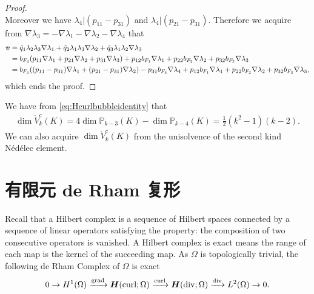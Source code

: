 \begin{proof}
\[\]
Moreover we have $\lambda_4|(p_{11}-p_{31})$ and $\lambda_4|(p_{21}-p_{31})$.
Therefore we acquire from $\nabla\lambda_{3}=-\nabla\lambda_{1}-\nabla\lambda_{2}-\nabla\lambda_{4}$ that
\begin{align*}
\boldsymbol v&=\tilde q_1\lambda_2\lambda_3\nabla\lambda_{1}+\tilde q_2\lambda_1\lambda_3\nabla\lambda_{2}+\tilde q_3\lambda_1\lambda_2\nabla\lambda_{3} \\
&=b_{F_4}(p_{11}\nabla\lambda_{1}+p_{21}\nabla\lambda_{2}+p_{31}\nabla\lambda_{3}) +p_{12}b_{F_1}\nabla\lambda_{1}+p_{22}b_{F_2}\nabla\lambda_{2}+p_{32}b_{F_3}\nabla\lambda_{3} \\
&=b_{F_4}((p_{11}-p_{31})\nabla\lambda_{1}+(p_{21}-p_{31})\nabla\lambda_{2}) - p_{31}b_{F_4}\nabla\lambda_{4} +p_{12}b_{F_1}\nabla\lambda_{1}+p_{22}b_{F_2}\nabla\lambda_{2}+p_{32}b_{F_3}\nabla\lambda_{3},
\end{align*}
which ends the proof.
\end{proof}

We have from \eqref{eq:Hcurlbubbleidentity} that
\begin{align*}
\dim\mathring V_{k}^c(K)=4\dim\mathbb P_{k-3}(K)-\dim\mathbb P_{k-4}(K)=\frac{1}{2}(k^2-1)(k-2).
\end{align*}
We can also acquire $\dim\mathring V_{k}^c(K)$ from the unisolvence of the second kind N\'ed\'elec element.

\section{有限元 de Rham 复形}
Recall that a Hilbert complex is a sequence of Hilbert spaces connected by a sequence of linear operators satisfying the property: the composition of two consecutive operators is vanished. A Hilbert complex is exact means the range of each map is the kernel of the succeeding map. As $\Omega$ is topologically trivial, the following de Rham Complex of $\Omega$ is exact
\begin{equation}\label{eq:derham}
0\xrightarrow{} H^1(\Omega)\xrightarrow{\operatorname{grad}}\boldsymbol H(\operatorname{curl};\Omega)\xrightarrow{\operatorname{curl}}\boldsymbol H(\operatorname{div};\Omega)\xrightarrow{\operatorname{div}}L^2(\Omega) \xrightarrow{}0.
\end{equation}
